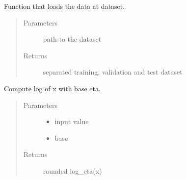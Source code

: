 \documentclass[letterpaper,10pt,english]{sphinxmanual}
\begin{document}
\begin{fulllineitems}
\label{\detokenize{index:utils.load_data}}
Function that loads the data at dataset.
\begin{quote}\begin{description}
\item[{Parameters}] \leavevmode
{} \textendash{} path to the dataset

\item[{Returns}] \leavevmode
separated training, validation and test dataset

\end{description}\end{quote}

\end{fulllineitems}


\begin{fulllineitems}
\label{\detokenize{index:utils.log_eta}}
Compute log of x with base eta.
\begin{quote}\begin{description}
\item[{Parameters}] \leavevmode\begin{itemize}
\item {} 
 \textendash{} input value

\item {} 
 \textendash{} base

\end{itemize}

\item[{Returns}] \leavevmode
rounded log\_eta(x)

\end{description}\end{quote}

\end{fulllineitems}

\end{document}
